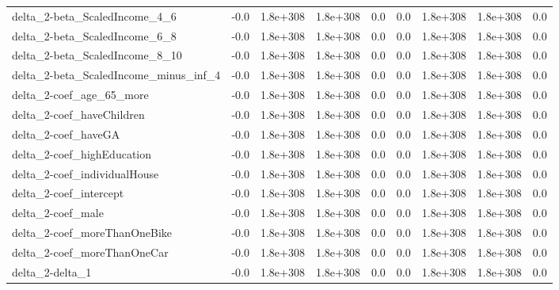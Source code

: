 \begin{tabular}{lrrrrrrrr}
delta_2-beta_ScaledIncome_4_6 & -0.0 & 1.8e+308 & 1.8e+308 & 0.0 & 0.0 & 1.8e+308 & 1.8e+308 & 0.0 \\
delta_2-beta_ScaledIncome_6_8 & -0.0 & 1.8e+308 & 1.8e+308 & 0.0 & 0.0 & 1.8e+308 & 1.8e+308 & 0.0 \\
delta_2-beta_ScaledIncome_8_10 & -0.0 & 1.8e+308 & 1.8e+308 & 0.0 & 0.0 & 1.8e+308 & 1.8e+308 & 0.0 \\
delta_2-beta_ScaledIncome_minus_inf_4 & -0.0 & 1.8e+308 & 1.8e+308 & 0.0 & 0.0 & 1.8e+308 & 1.8e+308 & 0.0 \\
delta_2-coef_age_65_more & -0.0 & 1.8e+308 & 1.8e+308 & 0.0 & 0.0 & 1.8e+308 & 1.8e+308 & 0.0 \\
delta_2-coef_haveChildren & -0.0 & 1.8e+308 & 1.8e+308 & 0.0 & 0.0 & 1.8e+308 & 1.8e+308 & 0.0 \\
delta_2-coef_haveGA & -0.0 & 1.8e+308 & 1.8e+308 & 0.0 & 0.0 & 1.8e+308 & 1.8e+308 & 0.0 \\
delta_2-coef_highEducation & -0.0 & 1.8e+308 & 1.8e+308 & 0.0 & 0.0 & 1.8e+308 & 1.8e+308 & 0.0 \\
delta_2-coef_individualHouse & -0.0 & 1.8e+308 & 1.8e+308 & 0.0 & 0.0 & 1.8e+308 & 1.8e+308 & 0.0 \\
delta_2-coef_intercept & -0.0 & 1.8e+308 & 1.8e+308 & 0.0 & 0.0 & 1.8e+308 & 1.8e+308 & 0.0 \\
delta_2-coef_male & -0.0 & 1.8e+308 & 1.8e+308 & 0.0 & 0.0 & 1.8e+308 & 1.8e+308 & 0.0 \\
delta_2-coef_moreThanOneBike & -0.0 & 1.8e+308 & 1.8e+308 & 0.0 & 0.0 & 1.8e+308 & 1.8e+308 & 0.0 \\
delta_2-coef_moreThanOneCar & -0.0 & 1.8e+308 & 1.8e+308 & 0.0 & 0.0 & 1.8e+308 & 1.8e+308 & 0.0 \\
delta_2-delta_1 & -0.0 & 1.8e+308 & 1.8e+308 & 0.0 & 0.0 & 1.8e+308 & 1.8e+308 & 0.0 \\
\end{tabular}
